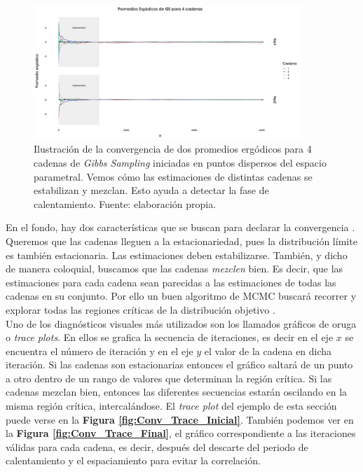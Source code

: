 \begin{figure}[h]
	\centering
	\includegraphics[width=0.9\textwidth]{Figs/Bayes/Ejemplos_Convergencia_Prom_Erg}
	\caption{Ilustración de la convergencia de dos promedios ergódicos para 4 cadenas de \textit{Gibbs Sampling} iniciadas en puntos dispersos del espacio parametral. Vemos cómo las estimaciones de distintas cadenas se estabilizan y mezclan. Esto ayuda a detectar la fase de calentamiento. Fuente: elaboración propia.}
	\label{fig:Conv_Prom_Erg}	
\end{figure}

En el fondo, hay dos características que se buscan para declarar la convergencia \parencite{Gelman13}. Queremos que las cadenas lleguen a la estacionariedad, pues la distribución límite es también estacionaria. Las estimaciones deben estabilizarse. También, y dicho de manera coloquial, buscamos que las cadenas \textit{mezclen} bien. Es decir, que las estimaciones para cada cadena sean parecidas a las estimaciones de todas las cadenas en su conjunto. Por ello un buen algoritmo de MCMC buscará recorrer y explorar todas las regiones críticas de la distribución objetivo \parencites{Neal93,Betancourt18}.\\ 

Uno de los diagnósticos visuales más utilizados son los llamados gráficos de oruga o \textit{trace plots}. En ellos se grafica la secuencia de iteraciones, es decir en el eje $x$ se encuentra el número de iteración y en el eje $y$ el valor de la cadena en dicha iteración. Si las cadenas son estacionarias entonces el gráfico saltará de un punto a otro dentro de un rango de valores que determinan la región crítica. Si las cadenas mezclan bien, entonces las diferentes secuencias estarán oscilando en la misma región crítica, intercalándose. El \textit{trace plot} del ejemplo de esta sección puede verse en la \textbf{Figura \ref{fig:Conv_Trace_Inicial}}. También podemos ver en la \textbf{Figura \ref{fig:Conv_Trace_Final}}, el gráfico correspondiente a las iteraciones válidas para cada cadena, es decir, después del descarte del periodo de calentamiento y el espaciamiento para evitar la correlación.\\

